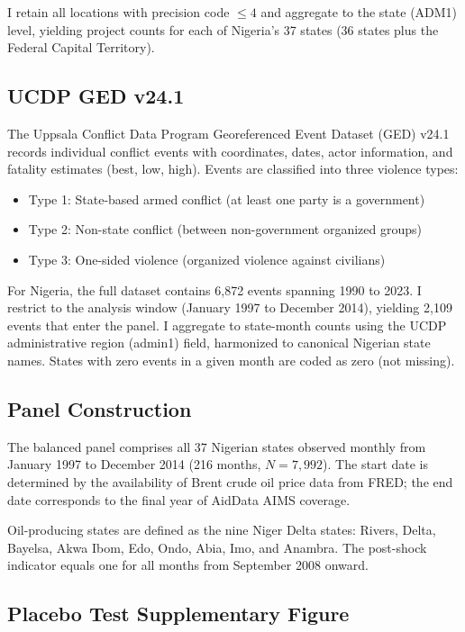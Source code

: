 \documentclass[12pt]{article}
\begin{document}
I retain all locations with precision code $\leq 4$ and aggregate to the state (ADM1) level, yielding project counts for each of Nigeria's 37 states (36 states plus the Federal Capital Territory).

\subsection{UCDP GED v24.1}

The Uppsala Conflict Data Program Georeferenced Event Dataset (GED) v24.1 records individual conflict events with coordinates, dates, actor information, and fatality estimates (best, low, high). Events are classified into three violence types:

\begin{itemize}
\item Type 1: State-based armed conflict (at least one party is a government)
\item Type 2: Non-state conflict (between non-government organized groups)
\item Type 3: One-sided violence (organized violence against civilians)
\end{itemize}

For Nigeria, the full dataset contains 6,872 events spanning 1990 to 2023. I restrict to the analysis window (January 1997 to December 2014), yielding 2,109 events that enter the panel. I aggregate to state-month counts using the UCDP administrative region (admin1) field, harmonized to canonical Nigerian state names. States with zero events in a given month are coded as zero (not missing).

\subsection{Panel Construction}

The balanced panel comprises all 37 Nigerian states observed monthly from January 1997 to December 2014 (216 months, $N = 7{,}992$). The start date is determined by the availability of Brent crude oil price data from FRED; the end date corresponds to the final year of AidData AIMS coverage.

Oil-producing states are defined as the nine Niger Delta states: Rivers, Delta, Bayelsa, Akwa Ibom, Edo, Ondo, Abia, Imo, and Anambra. The post-shock indicator equals one for all months from September 2008 onward.

\subsection{Placebo Test Supplementary Figure}
\end{document}
